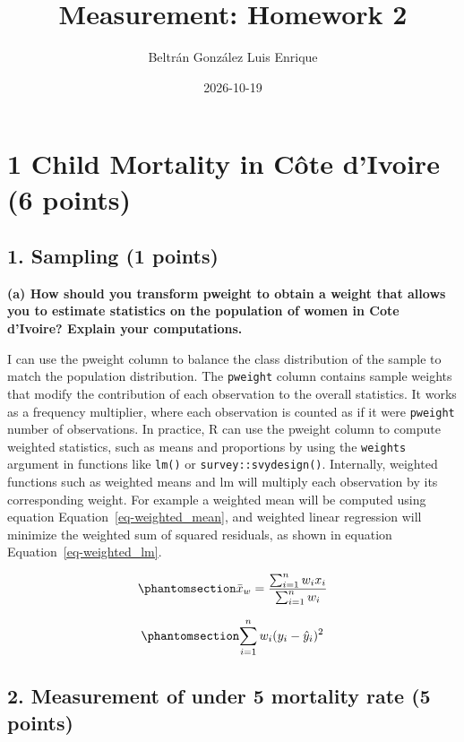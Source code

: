\documentclass[
  letterpaper,
  DIV=11,
  numbers=noendperiod]{scrartcl}
\title{Measurement: Homework 2}
\author{Beltrán González Luis Enrique}
\date{2026-10-19}
\begin{document}
\maketitle


\section{1 Child Mortality in Côte d'Ivoire (6
points)}\label{child-mortality-in-cuxf4te-divoire-6-points}

\subsection{1. Sampling (1 points)}\label{sampling-1-points}

\textbf{(a) How should you transform pweight to obtain a weight that
allows you to estimate statistics on the population of women in Cote
d'Ivoire? Explain your computations.}

I can use the pweight column to balance the class distribution of the
sample to match the population distribution. The \texttt{pweight} column
contains sample weights that modify the contribution of each observation
to the overall statistics. It works as a frequency multiplier, where
each observation is counted as if it were \texttt{pweight} number of
observations. In practice, R can use the pweight column to compute
weighted statistics, such as means and proportions by using the
\texttt{weights} argument in functions like \texttt{lm()} or
\texttt{survey::svydesign()}. Internally, weighted functions such as
weighted means and lm will multiply each observation by its
corresponding weight. For example a weighted mean will be computed using
equation Equation~\ref{eq-weighted_mean}, and weighted linear regression
will minimize the weighted sum of squared residuals, as shown in
equation Equation~\ref{eq-weighted_lm}.

\begin{equation}\protect\phantomsection\label{eq-weighted_mean}{
\bar{x}_w = \frac{\sum_{i=1}^{n} w_i x_i}{\sum_{i=1}^{n} w_i}
}\end{equation}

\begin{equation}\protect\phantomsection\label{eq-weighted_lm}{
\sum_{i=1}^{n} w_i (y_i - \hat{y}_i)^2
}\end{equation}

\subsection{2. Measurement of under 5 mortality rate (5
points)}\label{measurement-of-under-5-mortality-rate-5-points}
\end{document}
